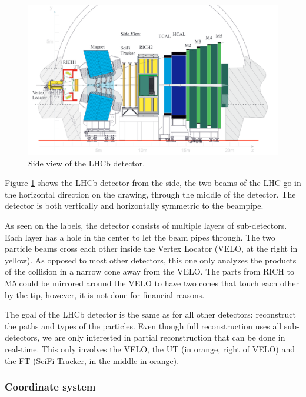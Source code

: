 \documentclass[12pt]{article}
\begin{document}
\begin{figure}[H]
	\includegraphics[width=\textwidth]{lhcb_geometry_upgrade}
	\caption[LHCB detector side view]{Side view of the LHCb detector. \cite{tracker_tdr}}
	\label{fig_lhcb_geometry}
\end{figure}

Figure \ref{fig_lhcb_geometry} shows the LHCb detector from the side, the two beams of the LHC go in the horizontal direction on the drawing, through the middle of the detector. The detector is both vertically and horizontally symmetric to the beampipe.

As seen on the labels, the detector consists of multiple layers of sub-detectors. Each layer has a hole in the center to let the beam pipes through. The two particle beams cross each other inside the Vertex Locator (VELO, at the right in yellow). As opposed to most other detectors, this one only analyzes the products of the collision in a narrow cone away from the VELO. The parts from RICH to M5 could be mirrored around the VELO to have two cones that touch each other by the tip, however, it is not done for financial reasons.

The goal of the LHCb detector is the same as for all other detectors: reconstruct the paths and types of the particles. Even though full reconstruction uses all sub-detectors, we are only interested in partial reconstruction that can be done in real-time. This only involves the VELO, the UT (in orange, right of VELO) and the FT (SciFi Tracker, in the middle in orange).

\newpage
\subsubsection{Coordinate system}\label{sec_coordinate_system}
\end{document}
